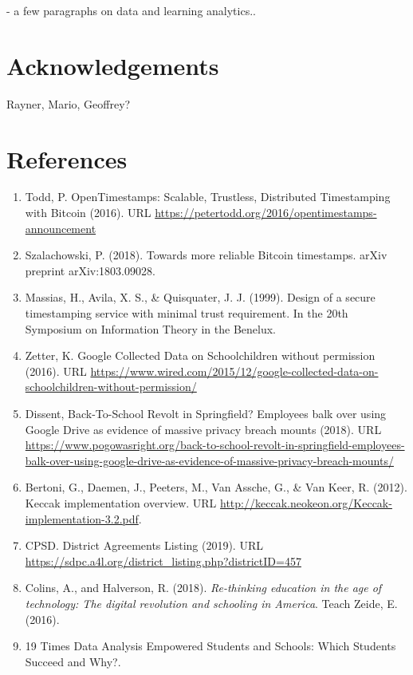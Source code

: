 \documentclass{article}
\begin{document}
- a few paragraphs on data and learning analytics..



\section{Acknowledgements}
Rayner, Mario, Geoffrey?

\section{References}
\begin{enumerate}
    \label{sec:1}
    \item Todd, P. OpenTimestamps: Scalable, Trustless, Distributed Timestamping with Bitcoin (2016). URL \url{https://petertodd.org/2016/opentimestamps-announcement}
    \label{sec:2}
    \item Szalachowski, P. (2018). Towards more reliable Bitcoin timestamps. arXiv preprint arXiv:1803.09028.
    \label{sec:3}
    \item Massias, H., Avila, X. S., \& Quisquater, J. J. (1999). Design of a secure timestamping service with minimal trust requirement. In the 20th Symposium on Information Theory in the Benelux.
    \label{sec:4}
    \item Zetter, K. Google Collected Data on Schoolchildren without permission (2016). URL \url{https://www.wired.com/2015/12/google-collected-data-on-schoolchildren-without-permission/}
    \label{sec:5}
    \item Dissent, Back-To-School Revolt in Springfield? Employees balk over using Google Drive as evidence of massive privacy breach mounts (2018).  URL \url{https://www.pogowasright.org/back-to-school-revolt-in-springfield-employees-balk-over-using-google-drive-as-evidence-of-massive-privacy-breach-mounts/}
    \label{sec:6}
    \item Bertoni, G., Daemen, J., Peeters, M., Van Assche, G., \& Van Keer, R. (2012). Keccak implementation overview. URL  \url{http://keccak.neokeon.org/Keccak-implementation-3.2.pdf}.
    \label{sec:7}
    \item CPSD. District Agreements Listing (2019). URL  \url{https://sdpc.a4l.org/district_listing.php?districtID=457}
    \label{sec:8}
    \item Colins, A., and Halverson, R. (2018).\textit{ Re-thinking education in the age of technology: The digital revolution and schooling in America}. Teach Zeide, E. (2016).
    \label{sec:9}
    \item 19 Times Data Analysis Empowered Students and Schools: Which Students Succeed and Why?.

\end{enumerate}
\end{document}
